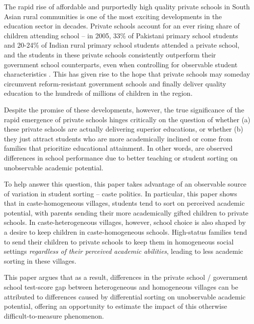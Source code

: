 \documentclass[Eubank_pk_ethnic_sorting.tex]{subfiles}
\begin{document}
The rapid rise of affordable and purportedly high quality private schools in South Asian rural communities is one of the most exciting developments in the education sector in decades. Private schools account for an ever rising share of children attending school -- in 2005, 33\% of Pakistani primary school students and 20-24\% of Indian rural primary school students attended a private school, and the students in these private schools consistently outperform their government school counterparts, even when controlling for observable student characteristics \citep{Jimenez:1991wa, Jimenez:1995vg, Pratham:2005vw, Andrabi:2011hl, Desai:2009ty, Tooley:2003vf, Alderman:2003we, Alderman:2001wk}. This has given rise to the hope that private schools may someday circumvent reform-resistant government schools and finally deliver quality education to the hundreds of millions of children in the region.

Despite the promise of these developments, however, the true significance of the rapid emergence of private schools hinges critically on the question of whether (a) these private schools are actually delivering superior educations, or whether (b) they just attract students who are more academically inclined or come from families that prioritize educational attainment. In other words, are observed differences in school performance due to better teaching or student sorting on unobservable academic potential. 

To help answer this question, this paper takes advantage of an observable source of variation in student sorting -- caste politics. In particular, this paper shows that in caste-homogeneous villages, students tend to sort on perceived academic potential, with parents sending their more academically gifted children to private schools. In caste-heterogeneous villages, however, school choice is also shaped by a desire to keep children in caste-homogeneous schools. High-status families tend to send their children to private schools to keep them in homogeneous social settings \emph{regardless of their perceived academic abilities}, leading to less academic sorting in these villages. 

This paper argues that as a result, differences in the private school / government school test-score gap between heterogeneous and homogeneous villages can be attributed to differences caused by differential sorting on unobservable academic potential, offering an opportunity to estimate the impact of this otherwise difficult-to-measure phenomenon. 
\end{document}
